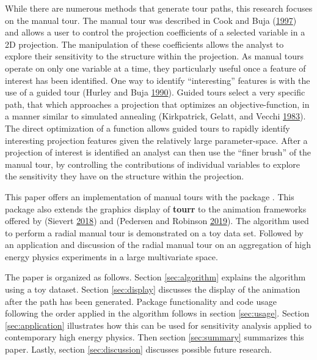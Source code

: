 While there are numerous methods that generate tour paths, this research
focuses on the manual tour. The manual tour was described in Cook and
Buja (\protect\hyperlink{ref-cook_manual_1997}{1997}) and allows a user
to control the projection coefficients of a selected variable in a 2D
projection. The manipulation of these coefficients allows the analyst to
explore their sensitivity to the structure within the projection. As
manual tours operate on only one variable at a time, they particularly
useful once a feature of interest has been identified. One way to
identify ``interesting'' features is with the use of a guided tour
(Hurley and Buja \protect\hyperlink{ref-hurley_analyzing_1990}{1990}).
Guided tours select a very specific path, that which approaches a
projection that optimizes an objective-function, in a manner similar to
simulated annealing (Kirkpatrick, Gelatt, and Vecchi
\protect\hyperlink{ref-kirkpatrick_optimization_1983}{1983}). The direct
optimization of a function allows guided tours to rapidly identify
interesting projection features given the relatively large
parameter-space. After a projection of interest is identified an analyst
can then use the ``finer brush'' of the manual tour, by controlling the
contributions of individual variables to explore the sensitivity they
have on the structure within the projection.

This paper offers an implementation of manual tours with the package
. This package also extends the graphics display of
\textbf{tourr} to the animation frameworks offered by 
(Sievert \protect\hyperlink{ref-sievert_plotly_2018}{2018}) and
 (Pedersen and Robinson
\protect\hyperlink{ref-pedersen_gganimate:_2019}{2019}). The algorithm
used to perform a radial manual tour is demonstrated on a toy data set.
Followed by an application and discussion of the radial manual tour on
an aggregation of high energy physics experiments in a large
multivariate space.

The paper is organized as follows. Section \ref{sec:algorithm} explains
the algorithm using a toy dataset. Section \ref{sec:display} discusses
the display of the animation after the path has been generated. Package
functionality and code usage following the order applied in the
algorithm follows in section \ref{sec:usage}. Section
\ref{sec:application} illustrates how this can be used for sensitivity
analysis applied to contemporary high energy physics. Then section
\ref{sec:summary} summarizes this paper. Lastly, section
\ref{sec:discussion} discusses possible future research.


